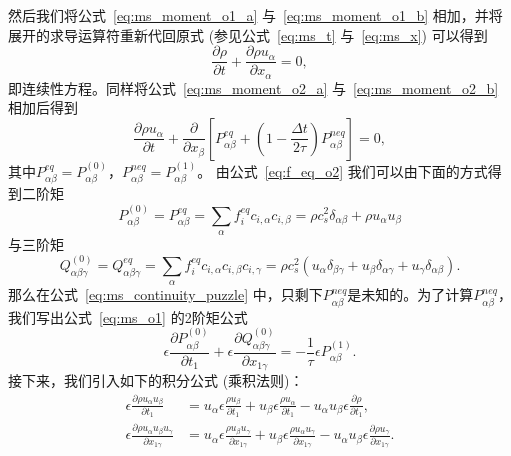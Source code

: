然后我们将公式~\ref{eq:ms_moment_o1_a} 与~\ref{eq:ms_moment_o1_b} 相加，并将展开的求导运算符重新代回原式 (参见公式~\ref{eq:ms_t} 与~\ref{eq:ms_x}) 可以得到
\begin{equation}
\frac{\partial \rho}{\partial t}+\frac{\partial \rho u_{\alpha}}{\partial x_{\alpha}}=0,
\end{equation}
即连续性方程。同样将公式~\ref{eq:ms_moment_o2_a} 与~\ref{eq:ms_moment_o2_b} 相加后得到
\begin{equation}
\frac{\partial \rho u_{\alpha}}{\partial t}+\frac{\partial}{\partial x_{\beta}}\left[P_{\alpha \beta}^{e q}+\left(1-\frac{\Delta t}{2 \tau}\right) P_{\alpha \beta}^{n e q}\right]=0,
\label{eq:ms_continuity_puzzle}
\end{equation}
其中$P_{\alpha \beta}^{e q}=P_{\alpha \beta}^{(0)}$，$P_{\alpha \beta}^{n e q}=P_{\alpha \beta}^{(1)}$。
由公式~\ref{eq:f_eq_o2} 我们可以由下面的方式得到二阶矩
\begin{equation}
P_{\alpha \beta}^{(0)}=P_{\alpha \beta}^{e q}=\sum_{\alpha} f_{i}^{e q} {c}_{i, \alpha} {c}_{i, \beta}=\rho c_{s}^{2}\delta_{\alpha \beta}+\rho u_{\alpha} u_{\beta}
\end{equation}
与三阶矩
\begin{equation}
Q_{\alpha \beta \gamma}^{(0)}=Q_{\alpha \beta \gamma}^{e q}=\sum_{\alpha} f_{i}^{e q} {c}_{i, \alpha} {c}_{i, \beta} {c}_{i, \gamma}=\rho c_{s}^{2}\left(u_{\alpha} \delta_{\beta \gamma}+u_{\beta} \delta_{\alpha \gamma}+u_{\gamma} \delta_{\alpha \beta}\right).
\end{equation}
那么在公式~\ref{eq:ms_continuity_puzzle} 中，只剩下$P_{\alpha \beta}^{n e q}$是未知的。为了计算$P_{\alpha \beta}^{n e q}$，我们写出公式~\ref{eq:ms_o1} 的2阶矩公式
\begin{equation}
\epsilon \frac{\partial P_{\alpha \beta}^{(0)}}{\partial t_{1}}+\epsilon \frac{\partial Q_{\alpha \beta \gamma}^{(0)}}{\partial x_{1 \gamma}}=-\frac{1}{\tau} \epsilon P_{\alpha \beta}^{(1)}.
\label{eq:ms_moment_o2}
\end{equation}
接下来，我们引入如下的积分公式 (乘积法则)：
\begin{align}
\epsilon \frac{\partial \rho u_{\alpha} u_{\beta}}{\partial t_{1}} & =u_{\alpha} \epsilon \frac{\rho u_{\beta}}{\partial t_{1}}+u_{\beta} \epsilon \frac{\rho u_{\alpha}}{\partial t_{1}}-u_{\alpha} u_{\beta} \epsilon \frac{\partial \rho}{\partial t_{1}}, \\
\epsilon \frac{\partial \rho u_{\alpha} u_{\beta} u_{\gamma}}{\partial x_{1 \gamma}} & =u_{\alpha} \epsilon \frac{\rho u_{\beta} u_{\gamma}}{\partial x_{1 \gamma}}+u_{\beta} \epsilon \frac{\rho u_{\alpha} u_{\gamma}}{\partial x_{1 \gamma}}-u_{\alpha} u_{\beta} \epsilon \frac{\partial \rho u_{\gamma}}{\partial x_{1 \gamma}} .
\end{align}
